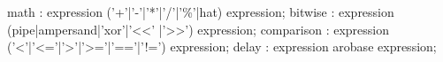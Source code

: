 \documentclass[11pt]{article}
\begin{document}
\begin{rail}
math : expression ('+'|'-'|'*'|'/'|'\%'|hat) expression;
bitwise : expression (pipe|ampersand|'xor'|'<<' |'>>') expression;
comparison : expression ('<'|'<='|'>'|'>='|'=='|'!=') expression;
delay : expression arobase expression; 
\end{rail}
\end{document}
